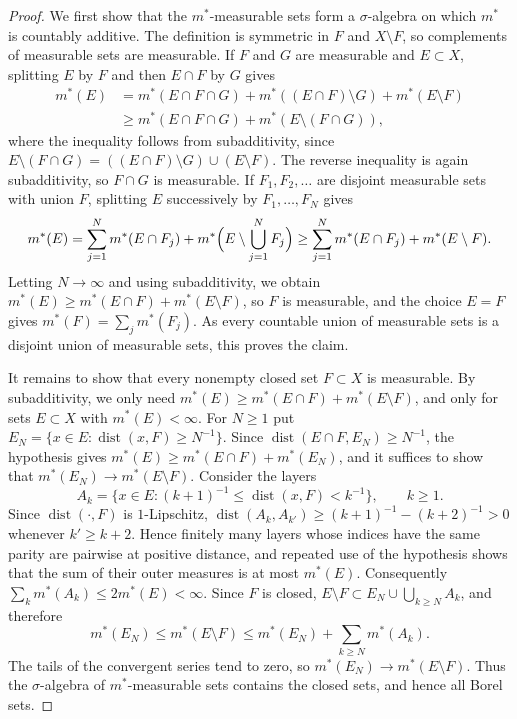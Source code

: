 \begin{proof}
We first show that the $m^*$-measurable sets form a $\sigma$-algebra on which $m^*$ is countably additive. The definition is symmetric in $F$ and $X\setminus F$, so complements of measurable sets are measurable. If $F$ and $G$ are measurable and $E\subset X$, splitting $E$ by $F$ and then $E\cap F$ by $G$ gives
\[
\begin{split}
 m^*(E)&=m^*(E\cap F\cap G)+m^*((E\cap F)\setminus G)+m^*(E\setminus F)\\
 &\geq m^*(E\cap F\cap G)+m^*(E\setminus(F\cap G)),
\end{split}
\]
where the inequality follows from subadditivity, since $E\setminus(F\cap G)=((E\cap F)\setminus G)\cup(E\setminus F)$. The reverse inequality is again subadditivity, so $F\cap G$ is measurable. If $F_1,F_2,\ldots$ are disjoint measurable sets with union $F$, splitting $E$ successively by $F_1,\ldots,F_N$ gives
\[
 m^*(E)=\sum_{j=1}^Nm^*(E\cap F_j)+m^*\Bigl(E\setminus\bigcup_{j=1}^NF_j\Bigr)\geq\sum_{j=1}^Nm^*(E\cap F_j)+m^*(E\setminus F).
\]
Letting $N\to\infty$ and using subadditivity, we obtain $m^*(E)\geq m^*(E\cap F)+m^*(E\setminus F)$, so $F$ is measurable, and the choice $E=F$ gives $m^*(F)=\sum_jm^*(F_j)$. As every countable union of measurable sets is a disjoint union of measurable sets, this proves the claim.

It remains to show that every nonempty closed set $F\subset X$ is measurable. By subadditivity, we only need $m^*(E)\geq m^*(E\cap F)+m^*(E\setminus F)$, and only for sets $E\subset X$ with $m^*(E)<\infty$. For $N\geq1$ put $E_N=\{x\in E:\operatorname{dist}(x,F)\geq N^{-1}\}$. Since $\operatorname{dist}(E\cap F,E_N)\geq N^{-1}$, the hypothesis gives $m^*(E)\geq m^*(E\cap F)+m^*(E_N)$, and it suffices to show that $m^*(E_N)\to m^*(E\setminus F)$. Consider the layers
\[
 A_k=\{x\in E:(k+1)^{-1}\leq\operatorname{dist}(x,F)<k^{-1}\},\qquad k\geq1.
\]
Since $\operatorname{dist}(\cdot,F)$ is $1$-Lipschitz, $\operatorname{dist}(A_k,A_{k'})\geq(k+1)^{-1}-(k+2)^{-1}>0$ whenever $k'\geq k+2$. Hence finitely many layers whose indices have the same parity are pairwise at positive distance, and repeated use of the hypothesis shows that the sum of their outer measures is at most $m^*(E)$. Consequently $\sum_km^*(A_k)\leq2m^*(E)<\infty$. Since $F$ is closed, $E\setminus F\subset E_N\cup\bigcup_{k\geq N}A_k$, and therefore
\[
 m^*(E_N)\leq m^*(E\setminus F)\leq m^*(E_N)+\sum_{k\geq N}m^*(A_k).
\]
The tails of the convergent series tend to zero, so $m^*(E_N)\to m^*(E\setminus F)$. Thus the $\sigma$-algebra of $m^*$-measurable sets contains the closed sets, and hence all Borel sets.
\end{proof}

